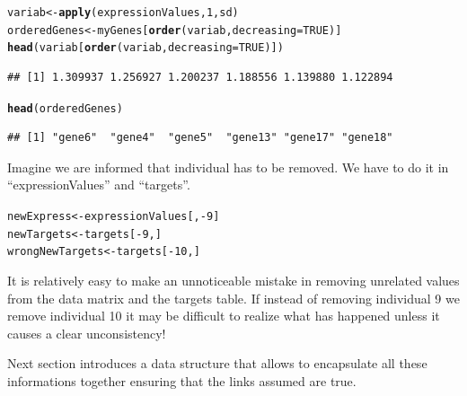 \documentclass[a4paper]{article}\usepackage[]{graphicx}\usepackage[]{color}
\makeatletter
\newcommand{\hlnum}[1]{\textcolor[rgb]{0.686,0.059,0.569}{#1}}%
\newcommand{\hlopt}[1]{\textcolor[rgb]{0,0,0}{#1}}%
\newcommand{\hlstd}[1]{\textcolor[rgb]{0.345,0.345,0.345}{#1}}%
\newcommand{\hlkwb}[1]{\textcolor[rgb]{0.69,0.353,0.396}{#1}}%
\newcommand{\hlkwc}[1]{\textcolor[rgb]{0.333,0.667,0.333}{#1}}%
\newcommand{\hlkwd}[1]{\textcolor[rgb]{0.737,0.353,0.396}{\textbf{#1}}}%
\newenvironment{kframe}{%
 \def\at@end@of@kframe{}%
 \ifinner\ifhmode%
  \def\at@end@of@kframe{\end{minipage}}%
  \begin{minipage}{\columnwidth}%
 \fi\fi%
 \def\FrameCommand##1{\hskip\@totalleftmargin \hskip-\fboxsep
 \colorbox{shadecolor}{##1}\hskip-\fboxsep
     \hskip-\linewidth \hskip-\@totalleftmargin \hskip\columnwidth}%
 \MakeFramed {\advance\hsize-\width
   \@totalleftmargin\z@ \linewidth\hsize
   \@setminipage}}%
 {\par\unskip\endMakeFramed%
 \at@end@of@kframe}
\newenvironment{knitrout}{}{} %
\makeatother
\begin{document}
\begin{knitrout}
\color{fgcolor}\begin{kframe}
\begin{alltt}
\hlstd{variab} \hlkwb{<-} \hlkwd{apply}\hlstd{(expressionValues,} \hlnum{1}\hlstd{, sd)}
\hlstd{orderedGenes} \hlkwb{<-} \hlstd{myGenes[}\hlkwd{order}\hlstd{(variab,} \hlkwc{decreasing}\hlstd{=}\hlnum{TRUE}\hlstd{)]}
\hlkwd{head}\hlstd{(variab[}\hlkwd{order}\hlstd{(variab,} \hlkwc{decreasing}\hlstd{=}\hlnum{TRUE}\hlstd{)])}
\end{alltt}
\begin{verbatim}
## [1] 1.309937 1.256927 1.200237 1.188556 1.139880 1.122894
\end{verbatim}
\begin{alltt}
\hlkwd{head}\hlstd{(orderedGenes)}
\end{alltt}
\begin{verbatim}
## [1] "gene6"  "gene4"  "gene5"  "gene13" "gene17" "gene18"
\end{verbatim}
\end{kframe}
\end{knitrout}

Imagine we are informed that individual has to be removed. We have to do it in ``expressionValues'' and ``targets''.

\begin{knitrout}
\color{fgcolor}\begin{kframe}
\begin{alltt}
\hlstd{newExpress}\hlkwb{<-} \hlstd{expressionValues[,}\hlopt{-}\hlnum{9}\hlstd{]}
\hlstd{newTargets} \hlkwb{<-} \hlstd{targets[}\hlopt{-}\hlnum{9}\hlstd{,]}
\hlstd{wrongNewTargets} \hlkwb{<-} \hlstd{targets [}\hlopt{-}\hlnum{10}\hlstd{,]}
\end{alltt}
\end{kframe}
\end{knitrout}
                                                                                                            It is relatively easy to make an unnoticeable mistake in removing unrelated values from the data matrix and the targets table. If instead of removing individual 9 we remove individual 10 it may be  difficult to realize what has happened unless it causes a clear unconsistency!

Next section introduces a data structure that allows to encapsulate all these informations together ensuring that the links assumed are true.
\end{document}
